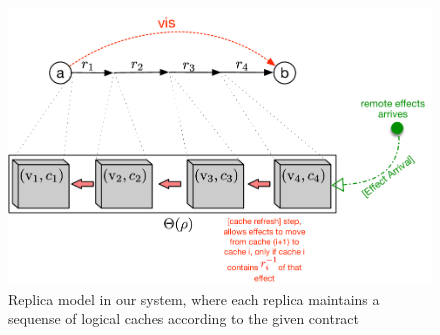 \begin{figure}[h]
\includegraphics[scale=0.6]{../Figures/Caches.pdf}
\caption{Replica model in our system, where each replica maintains a sequense of logical caches according to the given contract}
\label{fig:ctrt}
\end{figure}
